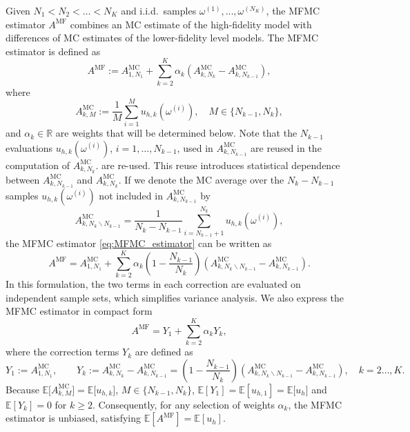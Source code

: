 Given $N_1 < N_2 < \ldots < N_K$ and i.i.d.\ samples $\omega^{(1)}, \ldots, \omega^{(N_K)}$,
the MFMC estimator $A^{\text{MF}}$ combines an MC estimate of the high-fidelity model with differences 
of MC estimates of the lower-fidelity level models.
The MFMC estimator is defined as
\begin{equation}\label{eq:MFMC_estimator}
    A^{\text{MF}}
     := A^{\text{MC}}_{1,N_1} + \sum_{k=2}^K \alpha_k\left(A^{\text{MC}}_{k,N_k} - A^{\text{MC}}_{k,N_{k-1}} \right),
\end{equation}
where
\begin{equation}\label{eq:MFMC_estimator_MCk}
     A^{\text{MC}}_{k,M} :=  \frac{1}{M} \sum_{i=1}^{M}   u_{h,k}(\omega^{(i)}), \quad M \in \{ N_{k-1}, N_k \},
\end{equation}
and $\alpha_k\in \mathbb{R}$ are weights that will be determined below.
Note that the $N_{k-1}$ evaluations $u_{h,k}(\omega^{(i)})$, $i = 1, \ldots,  N_{k-1}$,
used in  $A^{\text{MC}}_{k,N_{k-1}}$ are reused in  the computation of $A^{\text{MC}}_{k,N_k}$.
are re-used. This reuse introduces statistical dependence between 
$A^{\text{MC}}_{k,N_{k-1}}$ and $A^{\text{MC}}_{k,N_k}$. 
If we denote the MC average over the $N_k - N_{k-1}$ samples $u_{h,k}(\omega^{(i)})$ 
not included in $A^{\text{MC}}_{k,N_{k-1}}$ by
\[
     A^{\text{MC}}_{k,N_k \backslash N_{k-1}}
      =  \frac{1}{N_k-N_{k-1}}  \sum_{i=N_{k-1}+1}^{N_k}   u_{h,k}(\omega^{(i)}), 
\]
the MFMC estimator \eqref{eq:MFMC_estimator} can be written as
\begin{equation}\label{eq:MFMC_estimator_independent}
    A^{\text{MF}} 
    = A^{\text{MC}}_{1,N_1} 
      +  \sum_{k=2}^K \alpha_k\left(1-\frac{N_{k-1}}{N_k}\right)
                               \left(A_{k,N_k\backslash N_{k-1}}^{\text{MC}}-A_{k,N_{k-1}}^{\text{MC}}\right).
\end{equation}
In this formulation, the two terms in each correction are evaluated on independent sample sets, 
which simplifies variance analysis. 
We also express the MFMC estimator in compact form
\begin{equation*}\label{eq:MFMC_estimator_Correction}
          A^{\text{MF}} = Y_1 + \sum_{k=2}^K \alpha_k Y_k,
\end{equation*}
where the correction terms $Y_k$ are defined as
\begin{equation} \label{eq:MFMC_Yk}
       Y_1 := A^{\text{MC}}_{1,N_1},\qquad 
       Y_k := A^{\text{MC}}_{k,N_k} - A^{\text{MC}}_{k,N_{k-1}}
               =\left(1-\frac{N_{k-1}}{N_k}\right)
                 \left(A_{k,N_k\backslash N_{k-1}}^{\text{MC}}-A_{k,N_{k-1}}^{\text{MC}}\right), \quad k=2\ldots, K.
\end{equation}
%
Because $\mathbb{E}\big[ A^{\text{MC}}_{k,M} \big] = \mathbb{E}\big[ u_{h,k} \big]$, $M \in \{ N_{k-1}, N_k \}$,
$\mathbb{E}[Y_1] =  \mathbb{E}[u_{h,1}]  = \mathbb{E}\big[ u_h \big]$ and  $\mathbb{E}[Y_k] = 0$ for $k\ge 2$.
Consequently, for any selection of weights $\alpha_k$, 
the MFMC estimator is  unbiased, satisfying $\mathbb{E}[A^{\text{MF}}] =  \mathbb{E}[u_h]$. 


